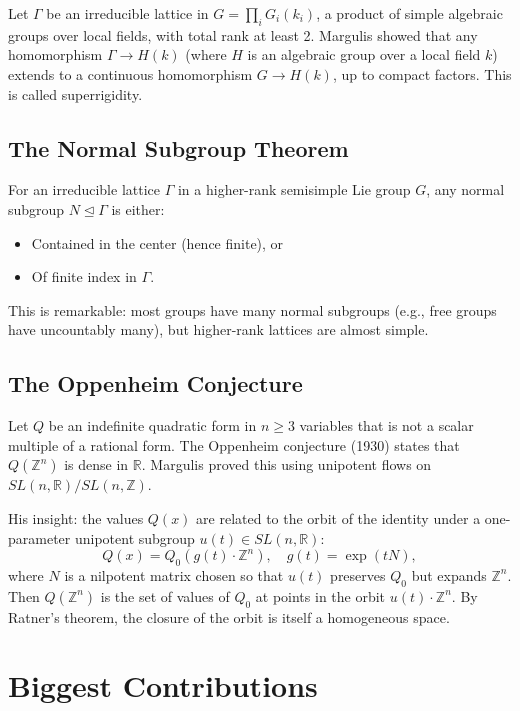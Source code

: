 Let $\Gamma$ be an irreducible lattice in $G = \prod_i G_i(k_i)$, a product of simple algebraic groups over local fields, with total rank at least 2. Margulis showed that any homomorphism $\Gamma \to H(k)$ (where $H$ is an algebraic group over a local field $k$) extends to a continuous homomorphism $G \to H(k)$, up to compact factors. This is called superrigidity.

\subsection{The Normal Subgroup Theorem}

For an irreducible lattice $\Gamma$ in a higher-rank semisimple Lie group $G$, any normal subgroup $N \trianglelefteq \Gamma$ is either:
\begin{itemize}
\item Contained in the center (hence finite), or
\item Of finite index in $\Gamma$.
\end{itemize}

This is remarkable: most groups have many normal subgroups (e.g., free groups have uncountably many), but higher-rank lattices are almost simple.

\subsection{The Oppenheim Conjecture}

Let $Q$ be an indefinite quadratic form in $n \geq 3$ variables that is not a scalar multiple of a rational form. The Oppenheim conjecture (1930) states that $Q(\mathbb{Z}^n)$ is dense in $\mathbb{R}$. Margulis proved this using unipotent flows on $SL(n,\mathbb{R})/SL(n,\mathbb{Z})$.

His insight: the values $Q(x)$ are related to the orbit of the identity under a one-parameter unipotent subgroup $u(t) \in SL(n,\mathbb{R})$:
\[
Q(x) = Q_0(g(t) \cdot \mathbb{Z}^n), \quad g(t) = \exp(tN),
\]
where $N$ is a nilpotent matrix chosen so that $u(t)$ preserves $Q_0$ but expands $\mathbb{Z}^n$. Then $Q(\mathbb{Z}^n)$ is the set of values of $Q_0$ at points in the orbit $u(t) \cdot \mathbb{Z}^n$. By Ratner's theorem, the closure of the orbit is itself a homogeneous space.

\section{Biggest Contributions}

